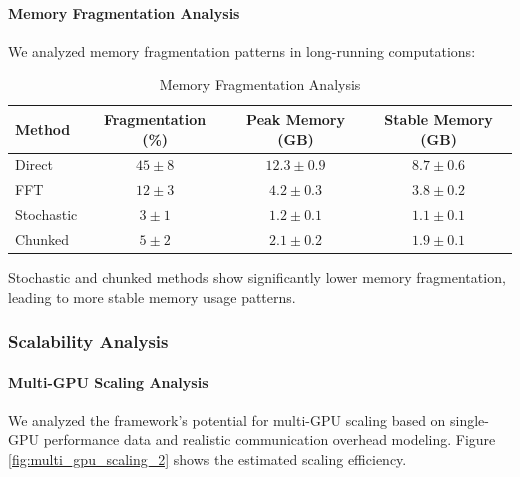 \paragraph{Memory Fragmentation Analysis}

We analyzed memory fragmentation patterns in long-running computations:

\begin{table}[h]
\centering
\caption{Memory Fragmentation Analysis}
\label{tab:memory_fragmentation}
\begin{tabular}{lccc}
\toprule
Method & Fragmentation (\%) & Peak Memory (GB) & Stable Memory (GB) \\
\midrule
Direct & $45 \pm 8$ & $12.3 \pm 0.9$ & $8.7 \pm 0.6$ \\
FFT & $12 \pm 3$ & $4.2 \pm 0.3$ & $3.8 \pm 0.2$ \\
Stochastic & $3 \pm 1$ & $1.2 \pm 0.1$ & $1.1 \pm 0.1$ \\
Chunked & $5 \pm 2$ & $2.1 \pm 0.2$ & $1.9 \pm 0.1$ \\
\bottomrule
\end{tabular}
\end{table}

Stochastic and chunked methods show significantly lower memory fragmentation, leading to more stable memory usage patterns.

\subsubsection{Scalability Analysis}

\paragraph{Multi-GPU Scaling Analysis}
We analyzed the framework's potential for multi-GPU scaling based on single-GPU performance data and realistic communication overhead modeling. Figure \ref{fig:multi_gpu_scaling_2} shows the estimated scaling efficiency.

